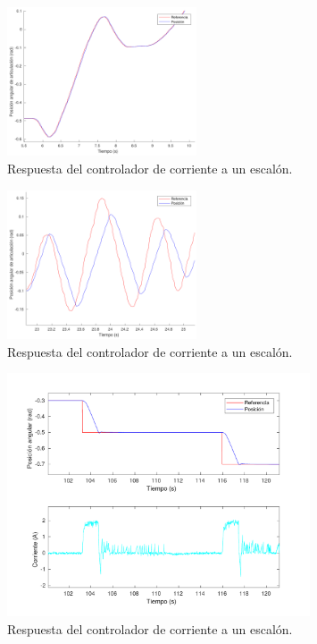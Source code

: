 \begin{figure}[H]
  \centering
  \includegraphics[width=0.5\textwidth]{img/cap5/ref_basica}
  \caption{Respuesta del controlador de corriente a un escalón.}
  \label{cap5_ref_basica}
\end{figure}



\begin{figure}[H]
  \centering
  \includegraphics[width=0.5\textwidth]{img/cap5/ref_retardo_vel}
  \caption{Respuesta del controlador de corriente a un escalón.}
  \label{cap5_ref_retardo_vel}
\end{figure}

\begin{figure}[H]
  \centering
  \includegraphics[width=0.8\textwidth]{img/cap5/ref_corriente_limitada}
  \caption{Respuesta del controlador de corriente a un escalón.}
  \label{cap5_ref_corriente_limitada}
\end{figure}

